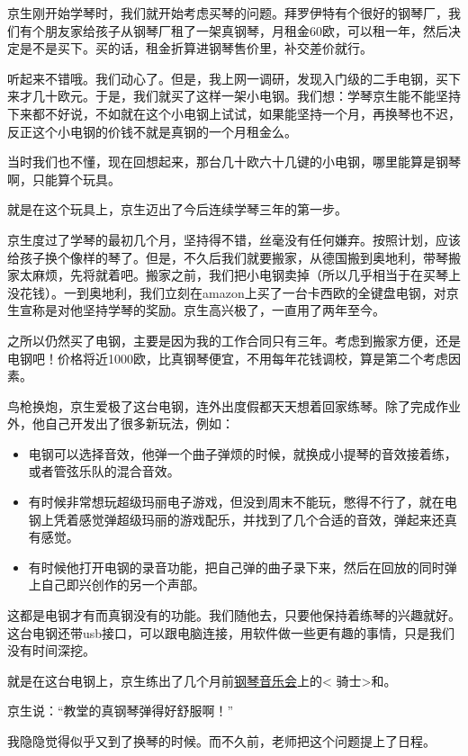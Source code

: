 \documentclass[twoside,openright,headings=optiontohead]{ctexbook} %
\providecommand{\tightlist}{%
   \setlength{\itemsep}{0pt}\setlength{\parskip}{0pt}}
\begin{document}
{京生刚开始学琴时，我们就开始考虑买琴的问题。拜罗伊特有个很好的钢琴厂，我们有个朋友家给孩子从钢琴厂租了一架真钢琴，月租金60欧，可以租一年，然后决定是不是买下。买的话，租金折算进钢琴售价里，补交差价就行。

听起来不错哦。我们动心了。但是，我上网一调研，发现入门级的二手电钢，买下来才几十欧元。于是，我们就买了这样一架小电钢。我们想：学琴京生能不能坚持下来都不好说，不如就在这个小电钢上试试，如果能坚持一个月，再换琴也不迟，反正这个小电钢的价钱不就是真钢的一个月租金么。

当时我们也不懂，现在回想起来，那台几十欧六十几键的小电钢，哪里能算是钢琴啊，只能算个玩具。

就是在这个玩具上，京生迈出了今后连续学琴三年的第一步。

京生度过了学琴的最初几个月，坚持得不错，丝毫没有任何嫌弃。按照计划，应该给孩子换个像样的琴了。但是，不久后我们就要搬家，从德国搬到奥地利，带琴搬家太麻烦，先将就着吧。搬家之前，我们把小电钢卖掉（所以几乎相当于在买琴上没花钱）。一到奥地利，我们立刻在amazon上买了一台卡西欧的全键盘电钢，对京生宣称是对他坚持学琴的奖励。京生高兴极了，一直用了两年至今。

之所以仍然买了电钢，主要是因为我的工作合同只有三年。考虑到搬家方便，还是电钢吧！价格将近1000欧，比真钢琴便宜，不用每年花钱调校，算是第二个考虑因素。

鸟枪换炮，京生爱极了这台电钢，连外出度假都天天想着回家练琴。除了完成作业外，他自己开发出了很多新玩法，例如：

\begin{itemize}
\tightlist
\item
  电钢可以选择音效，他弹一个曲子弹烦的时候，就换成小提琴的音效接着练，或者管弦乐队的混合音效。
\item
  有时候非常想玩超级玛丽电子游戏，但没到周末不能玩，憋得不行了，就在电钢上凭着感觉弹超级玛丽的游戏配乐，并找到了几个合适的音效，弹起来还真有感觉。
\item
  有时候他打开电钢的录音功能，把自己弹的曲子录下来，然后在回放的同时弹上自己即兴创作的另一个声部。
\end{itemize}

这都是电钢才有而真钢没有的功能。我们随他去，只要他保持着练琴的兴趣就好。这台电钢还带usb接口，可以跟电脑连接，用软件做一些更有趣的事情，只是我们没有时间深挖。

就是在这台电钢上，京生练出了几个月前\href{http://dapengde.com/archives/19165}{钢琴音乐会}上的\textless{}
骑士\textgreater{}和。

京生说：``教堂的真钢琴弹得好舒服啊！''

我隐隐觉得似乎又到了换琴的时候。而不久前，老师把这个问题提上了日程。

}
\end{document}

